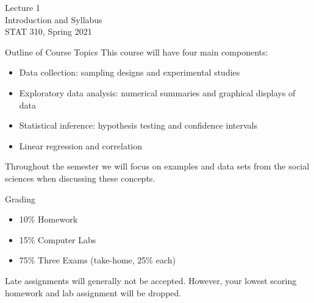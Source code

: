 \documentclass[10pt]{beamer}
\begin{document}
\begin{frame}
\large
Lecture 1\\
Introduction and Syllabus\\
STAT 310, Spring 2021
\end{frame}

\begin{frame}{Outline of Course Topics}
This course will have four main components:
\vspace{5pt}
\begin{itemize}
\item Data collection: sampling designs and experimental studies
\vspace{5pt}
\item Exploratory data analysis: numerical summaries and graphical displays of data
\vspace{5pt}
\item Statistical inference: hypothesis testing and confidence intervals 
\vspace{5pt}
\item Linear regression and correlation\\
\end{itemize}
\vspace{10pt}

Throughout the semester we will focus on examples and data sets from the social sciences when discussing these concepts.
\end{frame}

\begin{frame}{Grading}

\begin{itemize}
\item 10\% Homework
\item 15\% Computer Labs 
\item 75\% Three Exams (take-home, 25\% each)\\
\end{itemize}
\vspace{10pt}

Late assignments will generally not be accepted.  However, your lowest scoring homework and lab assignment will be dropped.
\end{frame}
\end{document}
